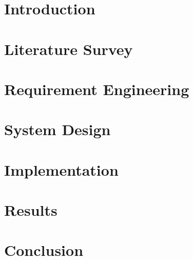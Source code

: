 \documentclass[a4paper, 11pt, oneside]{report}
\begin{document}
\newpage

\tableofcontents
\listoffigures
\listoftables

\chapter{Introduction}


\chapter{Literature Survey}


\chapter{Requirement Engineering}


\chapter{System Design}


\chapter{Implementation}


\chapter{Results}


\chapter{Conclusion}




\end{document}
